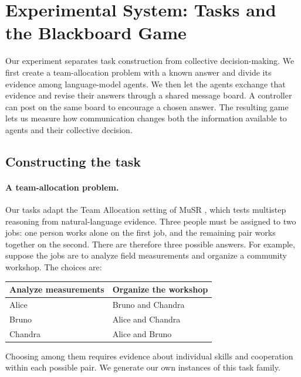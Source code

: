 \section{Experimental System: Tasks and the Blackboard Game}
\label{sec:methods_game}

Our experiment separates task construction from collective decision-making.
We first create a team-allocation problem with a known answer and divide its
evidence among language-model agents. We then let the agents exchange that
evidence and revise their answers through a shared message board. A controller
can post on the same board to encourage a chosen answer. The resulting game
lets us measure how communication changes both the information available to
agents and their collective decision.

\subsection{Constructing the task}
\label{sec:task_generation}

\paragraph{A team-allocation problem.}
Our tasks adapt the Team Allocation setting of MuSR
\citep{sprague2024musr}, which tests multistep reasoning from natural-language
evidence. Three people must be assigned to two jobs: one person works alone on
the first job, and the remaining pair works together on the second. There are
therefore three possible answers. For example, suppose the jobs are to analyze
field measurements and organize a community workshop. The choices are:
\begin{center}
\begin{tabular}{ll}
\toprule
Analyze measurements & Organize the workshop \\
\midrule
Alice & Bruno and Chandra \\
Bruno & Alice and Chandra \\
Chandra & Alice and Bruno \\
\bottomrule
\end{tabular}
\end{center}
Choosing among them requires evidence about individual skills and cooperation
within each possible pair. We generate our own instances of this task family.

